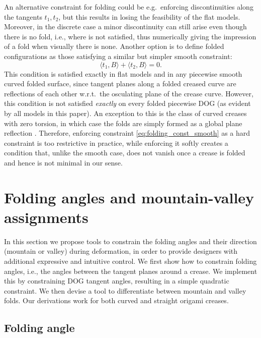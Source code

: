 An alternative constraint for folding could be e.g.\ enforcing discontinuities along the tangents $t_1,t_2$, but this results in losing the feasibility of the flat models. Moreover, in the discrete case a minor discontinuity can still arise even though there is no fold, i.e., where  is not satisfied, thus numerically giving the impression of a fold when visually there is none. Another option is to define folded configurations as those satisfying a similar but simpler smooth constraint:
%
\begin{equation} \label{eq:folding_const_smooth} 
\langle t_1,B\rangle + \langle t_2,B\rangle = 0.
\end{equation}
%
This condition is satisfied exactly in flat models and in any piecewise smooth curved folded surface, since tangent planes along a folded creased curve are reflections of each other w.r.t.\ the osculating plane of the crease curve. However, this condition is not satisfied \emph{exactly} on every folded piecewise DOG (as evident by all models in this paper). An exception to this is the class of curved creases with zero torsion, in which case the folds are simply formed as a global plane reflection \cite{Mitani_ref}. Therefore, enforcing constraint \eqref{eq:folding_const_smooth} as a hard constraint is too restrictive in practice, while enforcing it softly creates a condition that, unlike the smooth case, does not vanish once a crease is folded and hence is not minimal in our sense.


\section{Folding angles and mountain-valley assignments} \label{sec:folding_angles_mountain_valley}

In this section we propose tools to constrain the folding angles and their direction (mountain or valley) during deformation, in order to provide designers with additional expressive and intuitive control. We first show how to constrain folding angles, i.e., the angles between the tangent planes around a crease. We implement this by constraining DOG tangent angles, resulting in a simple quadratic constraint. We then devise a tool to differentiate between mountain and valley folds. Our derivations work for both curved and straight origami creases.

\subsection{Folding angle} \label{sec:folding_angle}

